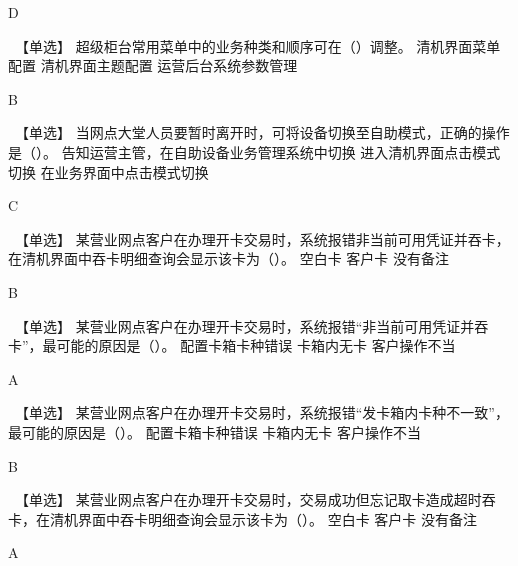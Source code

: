 \documentclass[kindlepaper]{BHCexam4kindle}
\begin{document}
\begin{questions}
\begin{solution} D \end{solution}
\qs　【单选】 超级柜台常用菜单中的业务种类和顺序可在（）调整。 \xx
{} {  清机界面菜单配置 } { 清机界面主题配置 } { 运营后台系统参数管理 }
\begin{solution} B \end{solution}
\qs　【单选】 当网点大堂人员要暂时离开时，可将设备切换至自助模式，正确的操作是（）。 \xx
{} {  告知运营主管，在自助设备业务管理系统中切换 } { 进入清机界面点击模式切换 } { 在业务界面中点击模式切换 }
\begin{solution} C \end{solution}
\qs　【单选】 某营业网点客户在办理开卡交易时，系统报错非当前可用凭证并吞卡，在清机界面中吞卡明细查询会显示该卡为（）。 \xx
{} {  空白卡 } { 客户卡 } { 没有备注 }
\begin{solution} B \end{solution}
\qs　【单选】 某营业网点客户在办理开卡交易时，系统报错“非当前可用凭证并吞卡”，最可能的原因是（）。 \xx
{} {  配置卡箱卡种错误 } { 卡箱内无卡 } { 客户操作不当 }
\begin{solution} A \end{solution}
\qs　【单选】 某营业网点客户在办理开卡交易时，系统报错“发卡箱内卡种不一致”，最可能的原因是（）。 \xx
{} {  配置卡箱卡种错误 } { 卡箱内无卡 } { 客户操作不当 }
\begin{solution} B \end{solution}
\qs　【单选】 某营业网点客户在办理开卡交易时，交易成功但忘记取卡造成超时吞卡，在清机界面中吞卡明细查询会显示该卡为（）。 \xx
{} {  空白卡 } { 客户卡 } { 没有备注 }
\begin{solution} A \end{solution}

\end{questions}
\end{document}
